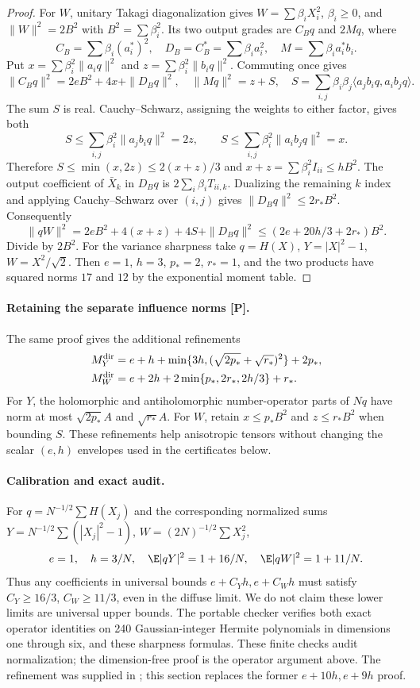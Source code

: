 \begin{proof}
For $W$, unitary Takagi diagonalization gives
$W=\sum\beta_iX_i^2$, $\beta_i\ge0$, and
$\|W\|^2=2B^2$ with $B^2=\sum\beta_i^2$.
Its two output grades are $C_Bq$ and $2Mq$, where
\[
 C_B=\sum\beta_i(a_i^*)^2,\quad D_B=C_B^*=\sum\beta_i a_i^2,
 \quad M=\sum\beta_i a_i^*b_i.
\]
Put $x=\sum\beta_i^2\|a_iq\|^2$ and $z=\sum\beta_i^2\|b_iq\|^2$.
Commuting once gives
\[
 \|C_Bq\|^2=2eB^2+4x+\|D_Bq\|^2,\quad
 \|Mq\|^2=z+S,\quad
 S=\sum_{i,j}\beta_i\beta_j\langle a_jb_iq,a_ib_jq\rangle.
\]
The sum $S$ is real. Cauchy--Schwarz, assigning the weights to either
factor, gives both
\[
 S\le\sum_{i,j}\beta_i^2\|a_jb_iq\|^2=2z,
 \qquad S\le\sum_{i,j}\beta_i^2\|a_ib_jq\|^2=x.
\]
Therefore $S\le\min(x,2z)\le2(x+z)/3$ and
$x+z=\sum\beta_i^2 I_{ii}\le hB^2$.
The output coefficient of $\bar X_k$ in $D_Bq$ is
$2\sum_i\beta_iT_{ii,k}$. Dualizing the remaining $k$ index and
applying Cauchy--Schwarz over $(i,j)$ gives
$\|D_Bq\|^2\le2r_*B^2$. Consequently
\begin{equation}\label{eq:quadratic-W-identity}
 \|qW\|^2=2eB^2+4(x+z)+4S+\|D_Bq\|^2
 \le(2e+20h/3+2r_*)B^2.
\end{equation}
Divide by $2B^2$. For the variance sharpness take
$q=H(X)$, $Y=|X|^2-1$, $W=X^2/\sqrt2$.
Then $e=1$, $h=3$, $p_*=2$, $r_*=1$, and the two products have
squared norms $17$ and $12$ by the exponential moment table.
\end{proof}

\paragraph{Retaining the separate influence norms [P].}
The same proof gives the additional refinements
\begin{align*}
 M_Y^{\rm dir}&=e+h+\min\{3h,(\sqrt{2p_*}+\sqrt{r_*})^2\}+2p_*,\\
 M_W^{\rm dir}&=e+2h+2\min\{p_*,2r_*,2h/3\}+r_*.
\end{align*}
For $Y$, the holomorphic and antiholomorphic number-operator parts of
$Nq$ have norm at most $\sqrt{2p_*}A$ and $\sqrt{r_*}A$.
For $W$, retain $x\le p_*B^2$ and $z\le r_*B^2$ when bounding $S$.
These refinements help anisotropic tensors without changing the
scalar $(e,h)$ envelopes used in the certificates below.

\paragraph{Calibration and exact audit.}
For $q=N^{-1/2}\sum H(X_j)$ and the corresponding normalized sums
$Y=N^{-1/2}\sum(|X_j|^2-1)$, $W=(2N)^{-1/2}\sum X_j^2$,
\[
 e=1,\quad h=3/N,\quad \E|qY|^2=1+16/N,\quad
 \E|qW|^2=1+11/N.
\]
Thus any coefficients in universal bounds $e+C_Yh,e+C_Wh$ must satisfy
$C_Y\ge16/3$, $C_W\ge11/3$, even in the diffuse limit. We do not
claim these lower limits are universal upper bounds.
The portable checker verifies both exact operator identities on 240
Gaussian-integer Hermite polynomials in dimensions one through six,
and these sharpness formulas. These finite checks audit normalization;
the dimension-free proof is the operator argument above.
The refinement was supplied in ;
this section replaces the former $e+10h,e+9h$ proof.

